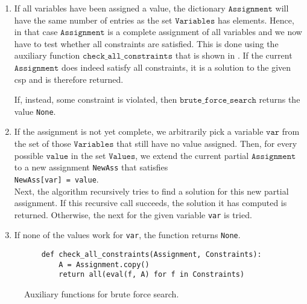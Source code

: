 \begin{enumerate}
\item If all variables have been assigned a value, the dictionary $\texttt{Assignment}$ will have the same
      number of entries as the set $\texttt{Variables}$ has elements.  Hence, in that case
      $\texttt{Assignment}$ is a complete assignment of all variables and we now have to test whether
      all constraints are satisfied.  This is done using the auxiliary function
      $\texttt{check\_all\_constraints}$ that is shown in . 
      If the current $\texttt{Assignment}$ does indeed satisfy all constraints, it is a solution to the given
      \ac{csp} and is therefore returned.

      If, instead, some constraint is violated, then $\texttt{brute\_force\_search}$ returns the value
      \texttt{None}.
\item If the assignment is not yet complete, we arbitrarily 
      pick a variable $\texttt{var}$ from the set of those $\texttt{Variables}$ that still have no value assigned.  
      Then, for every possible  $\texttt{value}$ in the set $\texttt{Values}$, we extend the current partial
      $\texttt{Assignment}$ to a new assignment \texttt{NewAss} that satisfies
      \\[0.2cm]
      \hspace*{1.3cm}
      \texttt{NewAss[var] = value}.
      \\[0.2cm]
      Next, the algorithm recursively tries to find a solution for this new partial assignment.
      If this recursive call succeeds, the solution it has computed is returned.  Otherwise, the next
      for the given variable \texttt{var} is tried.
\item If none of the values work for \texttt{var}, the function returns \texttt{None}.
\end{enumerate}


\begin{figure}[!ht]
\centering
\begin{verbatim}
    def check_all_constraints(Assignment, Constraints):
        A = Assignment.copy()
        return all(eval(f, A) for f in Constraints)
\end{verbatim}
\vspace*{-0.3cm}
\caption{Auxiliary functions for brute force search.}
\label{fig:Brute-Force-Solver.ipynb-2}
\end{figure}

